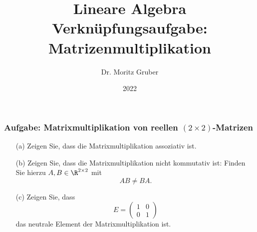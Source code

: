 

\title{Lineare Algebra\\[3mm] 
	\large Verknüpfungsaufgabe: Matrizenmultiplikation
}
\author{Dr. Moritz Gruber} 
\date{2022}



%
\begin{frame}[plain] 
 \titlepage
\end{frame}
%
%
\begin{frame} \frametitle{Aufgabe: Matrixmultiplikation von reellen $(2\times 2)$-Matrizen}

\begin{itemize}
	\item[(a)] Zeigen Sie, dass die Matrixmultiplikation assoziativ ist.
	\item[(b)] Zeigen Sie, dass die Matrixmultiplikation nicht kommutativ ist: 
			Finden Sie hierzu $A,B \in \R^{2\times 2}$ mit
			$$
				AB \neq BA.
			$$
	\item[(c)] Zeigen Sie, dass  
			$$
				E
				=
				\begin{pmatrix}
					1	&	0\\
					0	&	1
				\end{pmatrix}
			$$ 
			das neutrale Element der Matrixmultiplikation ist. 

\end{itemize}
\end{frame}
%

